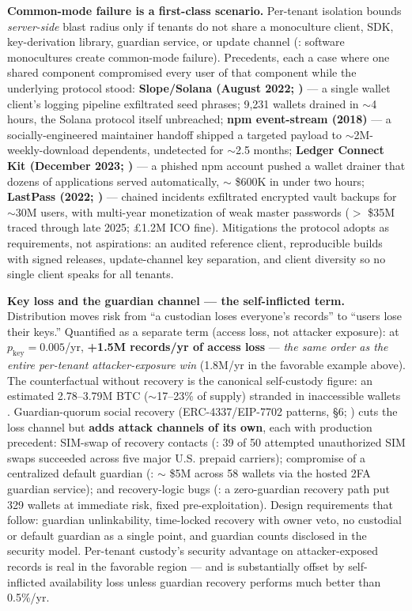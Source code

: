 \documentclass[11pt,twocolumn]{article}
\begin{document}
\textbf{Common-mode failure is a first-class scenario.} Per-tenant
isolation bounds \emph{server-side} blast radius only if tenants do not
share a monoculture client, SDK, key-derivation library, guardian
service, or update channel (\citealp{geer2003}: software monocultures
create common-mode failure). Precedents, each a case where one shared
component compromised every user of that component while the underlying
protocol stood: \textbf{Slope/Solana (August 2022;
\citealp{sentry2022})} --- a single wallet client's logging pipeline
exfiltrated seed phrases; 9,231 wallets drained in $\sim$4
hours, the Solana protocol itself unbreached; \textbf{npm event-stream
(2018)} --- a socially-engineered maintainer handoff shipped a targeted
payload to $\sim$2M-weekly-download dependents, undetected for
$\sim$2.5 months; \textbf{Ledger Connect Kit (December 2023;
\citealp{tangem2023})} --- a phished npm account pushed a wallet drainer
that dozens of applications served automatically, \(\sim\) \$600K in
under two hours; \textbf{LastPass (2022; \citealp{trm2025})} --- chained
incidents exfiltrated encrypted vault backups for $\sim$30M
users, with multi-year monetization of weak master passwords
(\(>\) \$35M traced through late 2025; \pounds 1.2M ICO fine).
Mitigations the protocol adopts as requirements, not aspirations: an
audited reference client, reproducible builds with signed releases,
update-channel key separation, and client diversity so no single client
speaks for all tenants.

\textbf{Key loss and the guardian channel --- the self-inflicted term.}
Distribution moves risk from ``a custodian loses everyone's records'' to
``users lose their keys.'' Quantified as a separate term (access loss,
not attacker exposure): at \(p_{\mathrm{key}} = 0.005\)/yr,
\textbf{+1.5M records/yr of access loss} --- \emph{the same order as the
entire per-tenant attacker-exposure win} (1.8M/yr in the favorable
example above). The counterfactual without recovery is the canonical
self-custody figure: an estimated 2.78--3.79M BTC
($\sim$17--23\% of supply) stranded in inaccessible wallets
\citep[as reported by \emph{Fortune}, 2017]{chainalysis2017}.
Guardian-quorum social recovery (ERC-4337/EIP-7702 patterns, §6;
\citealp{buterin2021}) cuts the loss channel but \textbf{adds attack
channels of its own}, each with production precedent: SIM-swap of
recovery contacts (\citealp{lee2020}: 39 of 50 attempted unauthorized
SIM swaps succeeded across five major U.S. prepaid carriers); compromise
of a centralized default guardian (\citealp{loopring2024}: \(\sim\) \$5M
across 58 wallets via the hosted 2FA guardian service); and
recovery-logic bugs (\citealp{openzeppelin2020}: a zero-guardian
recovery path put 329 wallets at immediate risk, fixed
pre-exploitation). Design requirements that follow: guardian
unlinkability, time-locked recovery with owner veto, no custodial or
default guardian as a single point, and guardian counts disclosed in the
security model. Per-tenant custody's security advantage on
attacker-exposed records is real in the favorable region --- and is
substantially offset by self-inflicted availability loss unless guardian
recovery performs much better than 0.5\%/yr.
\end{document}
